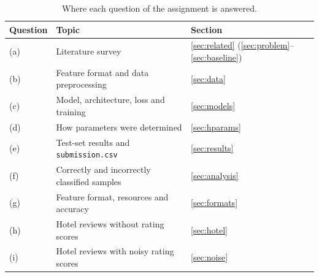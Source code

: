 \begin{table}[H]
\centering
\caption{Where each question of the assignment is answered.}
\label{tab:intro-map}
\small
\begin{tabular}{l l l}
\toprule
Question & Topic & Section \\
\midrule
(a) & Literature survey & \ref{sec:related} (\ref{sec:problem}--\ref{sec:baseline}) \\
(b) & Feature format and data preprocessing & \ref{sec:data} \\
(c) & Model, architecture, loss and training & \ref{sec:models} \\
(d) & How parameters were determined & \ref{sec:hparams} \\
(e) & Test-set results and \texttt{submission.csv} & \ref{sec:results} \\
(f) & Correctly and incorrectly classified samples & \ref{sec:analysis} \\
(g) & Feature format, resources and accuracy & \ref{sec:formats} \\
(h) & Hotel reviews without rating scores & \ref{sec:hotel} \\
(i) & Hotel reviews with noisy rating scores & \ref{sec:noise} \\
\bottomrule
\end{tabular}
\end{table}
